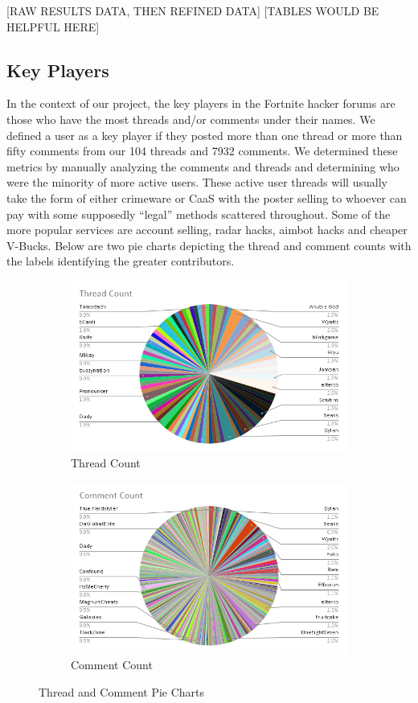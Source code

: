 \documentclass[sigconf]{acmart}
\begin{document}
[RAW RESULTS DATA, THEN REFINED DATA]
[TABLES WOULD BE HELPFUL HERE]

\subsection{Key Players}
In the context of our project, the key players in the Fortnite hacker forums are those who have the most threads and/or comments under their names. We defined a user as a key player if they posted more than one thread or more than fifty comments from our 104 threads and 7932 comments. We determined these metrics by manually analyzing the comments and threads and determining who were the minority of more active users. These active user threads will usually take the form of either crimeware or CaaS with the poster selling to whoever can pay with some supposedly “legal” methods scattered throughout. Some of the more popular services are account selling, radar hacks, aimbot hacks and cheaper V-Bucks. Below are two pie charts depicting the thread and comment counts with the labels identifying the greater contributors.


\begin{figure}
\centering
\begin{subfigure}{.5\textwidth}
 	\centering
	\includegraphics[width = .4\linewidth]{ThreadCount}
	\caption{Thread Count}
\end{subfigure}
\begin{subfigure}{.5\textwidth}
 	\centering
	\includegraphics[width=.4\linewidth]{CommentCount}
	\caption{Comment Count}
\end{subfigure}
\caption{Thread and Comment Pie Charts}
\end{figure}
\end{document}
